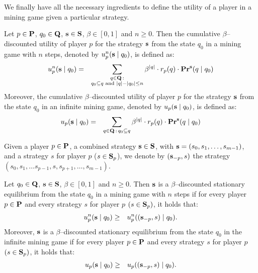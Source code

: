 We finally have all the necessary ingredients to define the utility of a player in a mining game given a particular strategy.
\begin{mydef}
Let $p \in \mathbf{P}$, $q_0 \in \mathbf{Q}$, $\mathbf{s} \in \mathbf{S}$, $\beta \in [0,1]$ and $n \geq 0$. Then the cumulative $\beta$--discounted utility of player $p$ for the strategy $\mathbf{s}$ from the state $q_0$ in a mining game with $n$ steps, denoted by $u_p^n(\mathbf{s} \mid q_0)$, is defined as:
\begin{eqnarray*}
u_p^n(\mathbf{s} \mid q_0) & = & \sum_{\substack{q \in \mathbf{Q} \,: \\ q_0 \subseteq q \text{ and } |q| - |q_0| \leq n}} \beta^{|q|} \cdot  r_p(q) \cdot \mathbf{Pr}^{\mathbf{s}}(q \mid q_0)
\end{eqnarray*}
Moreover, the cumulative $\beta$--discounted utility of player $p$ for the strategy $\mathbf{s}$ from the state $q_0$ in an infinite mining game, denoted by $u_p(\mathbf{s} \mid q_0)$, is defined as:
\begin{eqnarray*}
u_p(\mathbf{s} \mid q_0) & = & \sum_{q \in \mathbf{Q} \,:\, q_0 \subseteq q} \beta^{|q|} \cdot  r_p(q) \cdot \mathbf{Pr}^{\mathbf{s}}(q \mid q_0)
\end{eqnarray*}
\end{mydef}
Given a player $p \in \mathbf{P}$, a combined strategy $\mathbf{s} \in \mathbf{S}$, with $\mathbf{s} = (s_0,s_1, \ldots, s_{m-1})$, and a strategy $s$ for player $p$ ($s \in \mathbf{S}_p$), we denote by $(\mathbf{s}_{-p}, s)$ the strategy $(s_0, s_1, \ldots s_{p-1},s,s_{p+1}, \ldots, s_{m-1})$.
\begin{mydef}
Let $q_0 \in \mathbf{Q}$, $\mathbf{s} \in \mathbf{S}$, $\beta \in [0,1]$ and $n \geq 0$. Then $\mathbf{s}$ is a $\beta$--discounted stationary equilibrium from the state $q_0$ in a mining game with $n$ steps if for every player $p \in \mathbf{P}$ and every strategy $s$ for player $p$ $(s \in\mathbf{S}_p)$, it holds that:
\begin{eqnarray*}
u_p^n(\mathbf{s} \mid q_0)  & \geq  & u_p^n((\mathbf{s}_{-p},s) \mid q_0).
\end{eqnarray*}
Moreover, $\mathbf{s}$ is a $\beta$--discounted stationary equilibrium from the state $q_0$ in  the infinite mining game if for every player $p \in \mathbf{P}$ and every strategy $s$ for player $p$ $(s \in\mathbf{S}_p)$, it holds that:
\begin{eqnarray*}u_p(\mathbf{s} \mid q_0)  & \geq  & u_p ((\mathbf{s}_{-p},s) \mid q_0).
\end{eqnarray*}
\end{mydef}

